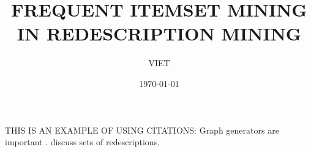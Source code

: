 \documentclass[mscthesis,english,oneside,biblatex]{uefcsthesis}
\title{FREQUENT ITEMSET MINING IN REDESCRIPTION MINING} %
\author{VIET}{TA} %
\date{\monthYearDateFormat\today}
\begin{document}
\maketitle
\begin{abstract}
  
\end{abstract}

\frontmatter
\tableofcontents
\mainmatter



THIS IS AN EXAMPLE OF USING CITATIONS:
Graph generators are important \citep{metzler18random}.
\citet{kalofolias18from} discuss sets of redescriptions.

\printbibliography[heading=bibintoc]

\backmatter %
\end{document}
